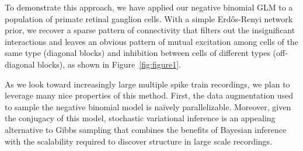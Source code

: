 \documentclass[aos,noinfoline]{imsart} %
\begin{document}
To demonstrate this approach, we have applied our negative binomial GLM to a population of primate retinal ganglion cells. With a simple Erd\H{o}s-Renyi network prior, we recover a sparse pattern of connectivity that filters out the insignificant interactions and leaves an obvious pattern of mutual excitation among cells of the same type (diagonal blocks) and inhibition between cells of different types (off-diagonal blocks), as shown in Figure~\ref{fig:figure1}. 

As we look toward increasingly large multiple spike train recordings, we plan to leverage many nice properties of this method. First, the data augmentation used to sample the negative binomial model is na\"ively parallelizable. Moreover, given the conjugacy of this model, stochastic variational inference is an appealing alternative to Gibbs sampling that combines the benefits of Bayesian inference with the scalability required to discover structure in large scale recordings. 

\vspace{-2em}
\renewcommand\refname{}

{\small }
\end{document}
